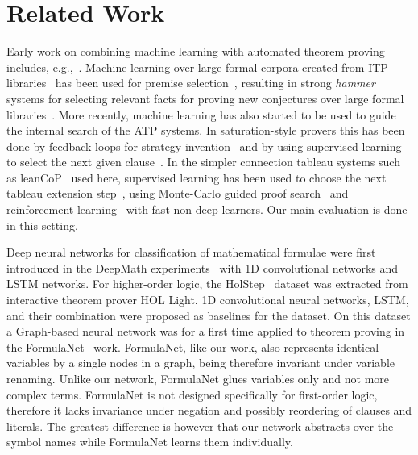 \documentclass{ecai}
\def\systemname#1{\textsf{#1}\xspace}
\newcommand{\lc}{\systemname{leanCoP}}
\begin{document}
\section{Related Work}

Early work on combining machine learning with automated theorem
proving includes,
e.g.,~\cite{DBLP:conf/ogai/ErtelSS89,DenzingerFGS99,DBLP:books/daglib/0002958}.
Machine learning over large formal corpora created from ITP
libraries~\cite{Urban06,MengP08,holyhammer} has been used for premise
selection~\cite{Urb04-MPTP0,US+08-long,KuhlweinLTUH12-long,IrvingSAECU16ju},
resulting in strong \emph{hammer} systems for selecting relevant facts
for proving new conjectures over large formal
libraries~\cite{abs-1108-3446,BlanchetteGKKU16,hh4h4}. More recently,
machine learning has also started to be used to guide the internal
search of the ATP systems. In saturation-style provers this has been
done by feedback loops for strategy
invention~\cite{blistr,JakubuvU18a,SchaferS15} and by using supervised
learning~\cite{JakubuvU17a,LoosISK17} to select the next given
clause~\cite{Overbeek:1974:NCA:321812.321814}. In the simpler
connection tableau systems such as \lc~\cite{OB03} used here, supervised
learning has been used to choose the next tableau extension
step~\cite{UrbanVS11,KaliszykU15}, using Monte-Carlo guided proof
search~\cite{FarberKU17} and reinforcement
learning~\cite{KaliszykUMO18} with fast non-deep learners. Our main evaluation is done in this setting.

Deep neural networks for classification of mathematical formulae were first
introduced in the DeepMath experiments~\cite{IrvingSAECU16ju}
with 1D convolutional networks and LSTM networks.
For higher-order logic, the HolStep~\cite{DBLP:conf/iclr/KaliszykCS17} dataset
was extracted from
interactive theorem prover HOL Light. 1D convolutional neural networks, LSTM, and their combination were proposed as baselines for the dataset.
On this dataset a Graph-based neural network was for a first time applied to theorem proving in the FormulaNet~\cite{DBLP:conf/nips/WangTWD17} work.
FormulaNet, like our work, also represents identical
variables by a single nodes in a graph, being therefore invariant
under variable renaming. Unlike our network, FormulaNet glues
variables only and not more complex terms.
FormulaNet is not designed
specifically for first-order logic, therefore it lacks invariance under
negation and possibly reordering of clauses and literals.
The
greatest difference is however that our network 
abstracts over the symbol names
while FormulaNet learns them individually.
\end{document}
